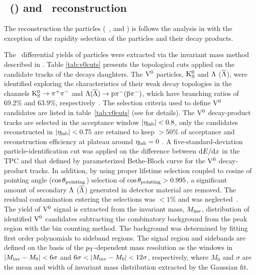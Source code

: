 \subsection{\lda\ (\alda) and \ks\ reconstruction}
\label{sec:V0Reco}

The reconstruction the \Vzero particles (\ks\, \lda, and \alda) is follows the analysis in \cite{Abelev:2013haa} with the exception of the rapidity selection of the particles and their decay products.


The \pt\ differential yields of \Vzero particles were extracted via the invariant mass method described in \cite{Abelev:2013haa}. Table \ref{tab:v0cuts} presents the topological cuts applied on the candidate tracks of the decays daughters. The ${\rm V}^{0}$ particles, $\rm{K}^{0}_{\rm S}$ and $\Lambda$ ($\overline{\Lambda}$), were identified exploring the characteristics of their weak decay topologies in the channels $\rm{K}^{0}_{\rm S}\to\pi^{+}\pi^{-}$ and $\Lambda(\overline{\Lambda})\to{\rm p}\pi^{-}(\overline{\rm p}\pi^{-})$, which have branching ratios of $69.2\%$ and $63.9\%$, respectively~\cite{Agashe:2014kda}.
The selection criteria used to define ${\rm V}^{0}$ candidates are listed in table~\ref{tab:v0cuts} (see \cite{Aamodt:2011zza} for details).
The ${\rm V}^{0}$ decay-product tracks are selected in the acceptance window $\left|\eta_{\rm lab}\right|<0.8$, only the candidates reconstructed in $\left|\eta_{\rm lab}\right|<0.75$ are retained to keep $>50\%$ of acceptance and reconstruction efficiency at plateau around $\eta_{\rm lab}=0$ .
A five-standard-deviation particle-identification cut was applied on the difference between ${\rm d}E/{\rm d}x$ in the TPC and that defined by parameterized Bethe-Bloch curve for the ${\rm V}^{0}$ decay-product tracks.
In addition, by using proper lifetime selection coupled to cosine of pointing angle ($\cos\theta_{\rm pointing}$) selection of $\cos\theta_{\rm pointing}>0.995$, a significant amount of secondary $\Lambda$ ($\overline{\Lambda}$) generated in detector material are removed.
The residual contamination entering the selections was $<1\%$ and was neglected~\cite{Abelev:2013xaa}.
The yield of ${\rm V}^{0}$ signal is extracted from the invariant mass, $M_{\rm inv}$, distribution of identified ${\rm V}^{0}$ candidates subtracting the combinatory background from the peak region with the bin counting method.
The background was determined by fitting first order polynomials to sideband regions.
The signal region and sidebands are defined on the basis of the $p_{\mathrm{T}}$-dependent mass resolution as the windows in $\left|M_{\rm inv}-M_{0}\right|<6\sigma$ and $6\sigma<\left|M_{\rm inv}-M_{0}\right|<12\sigma$, respectively, where $M_{0}$ and $\sigma$ are the mean and width of invariant mass distribution extracted by the Gaussian fit.

